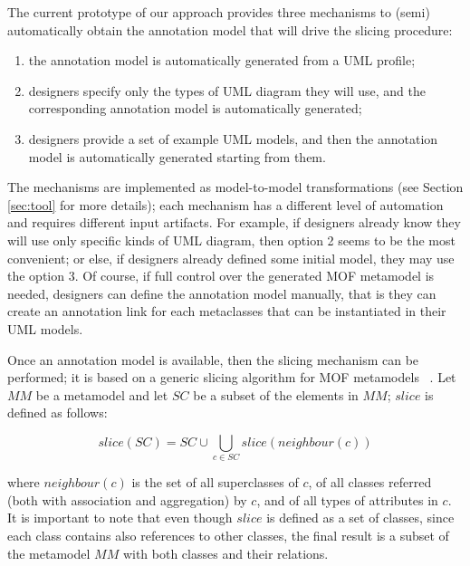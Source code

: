 The current prototype of our approach provides three mechanisms to (semi) automatically obtain the annotation model that will drive the slicing procedure:

\begin{enumerate}
	\item the annotation model is automatically generated from a UML profile;
	\item designers specify only the types of UML diagram they will use, and the corresponding annotation model is automatically generated;
	\item designers provide a set of example UML models, and then the annotation model is automatically generated starting from them.
\end{enumerate}

The mechanisms are implemented as model-to-model transformations (see Section \ref{sec:tool} for more details);
each mechanism has a different level of automation and requires different input artifacts.
For example, if designers already know they will use only specific kinds of UML diagram, then option 2 seems to be the most convenient;
or else, if designers already defined some initial model, they may use the option 3.
Of course, if full control over the generated MOF metamodel is needed, designers can define the annotation model manually, that is they can create an annotation link for each metaclasses that can be instantiated in their UML models.

Once an annotation model is available, then the slicing mechanism can be performed;
it is based on a generic slicing algorithm for MOF metamodels~\cite{ICSEbyadl}
. Let
$MM$ be a metamodel and let $SC$ be a subset of the elements in
$MM$; $slice$ is defined as follows:

\vspace{-.2cm}
$$slice(SC)=SC \cup \displaystyle\bigcup_{c \in
SC}{slice(neighbour(c))}$$
\vspace{-.2cm}

\noindent where $neighbour(c)$ is the set of all superclasses of
$c$, of all classes referred (both with association and
aggregation) by $c$, and of all types of attributes in $c$.
It is important to note that even though $slice$ is defined
as a set of classes, since each class contains also references
to other classes, the final result is a subset of the metamodel $MM$
with both classes and their relations.

